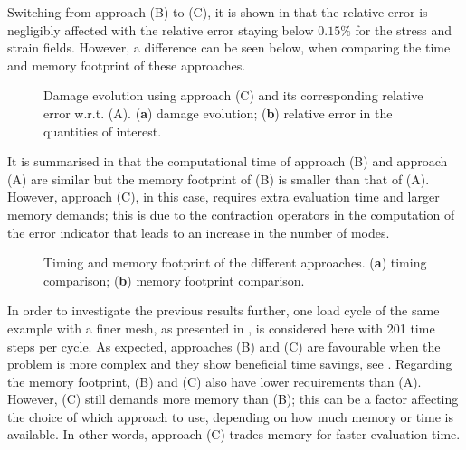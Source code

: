 Switching from approach (B) to (C), it is shown in  that the relative error is negligibly affected with the relative error staying below $0.15\unit{\%}$ for the stress and strain fields. However, a difference can be seen below, when comparing the time and memory footprint of these approaches.
\begin{figure}[hbt!]
	\centering
	\begin{subfigure}[t]{0.49\linewidth}
		
		\caption{}
		\label{fig_local_pgd_indic1}
	\end{subfigure}
	\hfil
	\begin{subfigure}[t]{0.49\linewidth}
		
		\caption{}
		\label{fig_local_pgd_indic2}
	\end{subfigure}
	\caption{Damage evolution using approach (C) and its corresponding relative error w.r.t. (A). (\textbf{a}) damage evolution; (\textbf{b}) relative error in the quantities of interest.}
	\label{fig_local_pgd_indic}
\end{figure}

It is summarised in  that the computational time of approach (B) and approach (A) are similar but the memory footprint of (B) is smaller than that of (A). However, approach (C), in this case, requires extra evaluation time and larger memory demands; this is due to the contraction operators in the computation of the error indicator that leads to an increase in the number of modes.

\begin{figure}[hbt!]
	\centering
	\begin{subfigure}[t]{0.49\linewidth}
		
		\caption{}
	\end{subfigure}
	\hfil
	\begin{subfigure}[t]{0.49\linewidth}
		
		\caption{}
	\end{subfigure}
	\caption{Timing and memory footprint of the different approaches. (\textbf{a}) timing comparison; (\textbf{b}) memory footprint comparison.}
	\label{fig_local_pgd_time}
\end{figure}

In order to investigate the previous results further, one load cycle of the same example with a finer mesh, as presented in , is considered here with 201 time steps per cycle. As expected, approaches (B) and (C) are favourable when the problem is more complex and they show beneficial time savings, see . Regarding the memory footprint, (B) and (C) also have lower requirements than (A). However, (C) still demands more memory than (B); this can be a factor affecting the choice of which approach to use, depending on how much memory or time is available. In other words, approach (C) trades memory for faster evaluation time.

